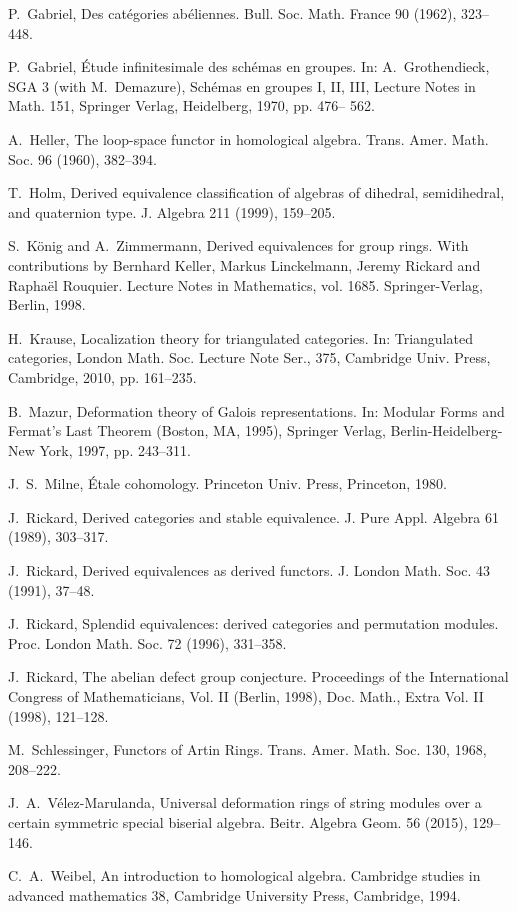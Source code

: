 \documentclass{amsart}
\theoremstyle{plain}
\theoremstyle{definition}
\theoremstyle{remark}
\begin{document}
\begin{thebibliography}{88}
 P.~Gabriel, Des cat\'{e}gories ab\'{e}liennes. Bull. Soc. Math. France 90 
(1962), 323--448.
	
 P.~Gabriel, \'{E}tude infinitesimale des sch\'{e}mas en groupes.
	In: A.~Grothendieck, SGA 3 (with M.~Demazure), Sch\'{e}mas en groupes I, II, III,
	Lecture Notes in Math. 151, Springer Verlag,
         Heidelberg, 1970, pp. 476-- 562.

 A.~Heller, The loop-space functor in homological algebra. Trans. Amer. Math. Soc. 96 (1960), 382--394.

 T.~Holm, Derived equivalence classification of algebras of
dihedral, semidihedral, and quaternion type. J. Algebra 211 (1999), 159--205.

 S.~K\"onig and A.~Zimmermann, Derived equivalences for group rings. With contributions by Bernhard Keller, Markus Linckelmann, Jeremy Rickard and Rapha\"{e}l Rouquier. Lecture Notes in Mathematics, vol. 1685. Springer-Verlag, Berlin, 1998.

 H.~Krause, Localization theory for triangulated categories. In: Triangulated categories, London Math. Soc. Lecture Note Ser., 375, Cambridge Univ. Press, Cambridge, 2010, pp. 161--235.

 B.~Mazur, Deformation theory of Galois representations. In:
        Modular Forms
        and Fermat's Last Theorem (Boston, MA, 1995), Springer Verlag,
        Berlin-Heidelberg-New York, 1997, pp. 243--311.
        
 J.~S.~Milne, \'{E}tale cohomology. Princeton Univ. Press, Princeton, 1980.

 J.~Rickard, Derived categories and stable equivalence. J. 
	Pure Appl. Algebra 61 (1989), 303--317.

 J.~Rickard, Derived equivalences as derived  functors.
        J. London Math. Soc. 43 (1991), 37--48.
        
 J.~Rickard, Splendid equivalences: derived categories and permutation
        modules. Proc. London Math. Soc. 72 (1996), 331--358.
        
 J.~Rickard, The abelian defect group conjecture. Proceedings of the International Congress
of Mathematicians, Vol. II (Berlin, 1998), Doc. Math., Extra Vol. II (1998), 121--128.
        	
 M.~Schlessinger, Functors of Artin Rings. Trans. Amer. Math. Soc.
        130, 1968, 208--222.
        
   J.~A.~V\'{e}lez-Marulanda,  Universal deformation rings of string modules over a certain 
 	symmetric special biserial algebra. Beitr. Algebra Geom. 56 (2015), 129--146.

 C.~A.~Weibel, An introduction to homological algebra. Cambridge studies
in advanced mathematics 38, Cambridge University Press, Cambridge, 1994.

\end{thebibliography}
\end{document}
